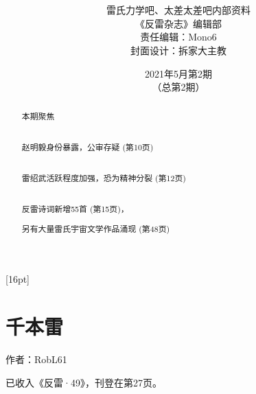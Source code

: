 \documentclass[UTF8,12pt,oneside]{ctexbook}
\title{\textbf{\fontsize{42}{84}{反雷杂志 \\[15] Anti-Lei Magazine}}}
\author{\Large \kaishu 雷氏力学吧、太差太差吧内部资料 \\[8] \Large \kaishu 《反雷杂志》编辑部 \\[8] \Large \kaishu 责任编辑：Mono6 \\[8] \Large \kaishu 封面设计：拆家大主教}
\date{\huge 2021年5月第2期 \\ （总第2期）}
\begin{document}
    
    \maketitle
    
    \setcounter{secnumdepth}{-2} 
    \setcounter{tocdepth}{1}
    [16pt]{\addvspace{2pt}\filright}
    {\contentspush{\thecontentslabel\hspace{0.8em}}}
    {}{\contentspage}
    
    \begin{abstract}
        \chapter{本期聚焦}
        \begin{center}
            \Large
            \kaishu
            ~\\
            赵明毅身份暴露，公审存疑 (第10页)
            
            ~\\
            雷绍武活跃程度加强，恐为精神分裂 (第12页)
            
            ~\\
            反雷诗词新增55首 (第15页)，
            
            另有大量雷氏宇宙文学作品涌现 (第48页)
           
            
            \songti
            \normalsize
        \end{center}
    \end{abstract}
    
    \chapter{千本雷}
    \large
    \begin{center}
    \kaishu
            作者：RobL61
            
            已收入《反雷·49》，刊登在第27页。
    \songti
    \end{center}
        
\end{document}
